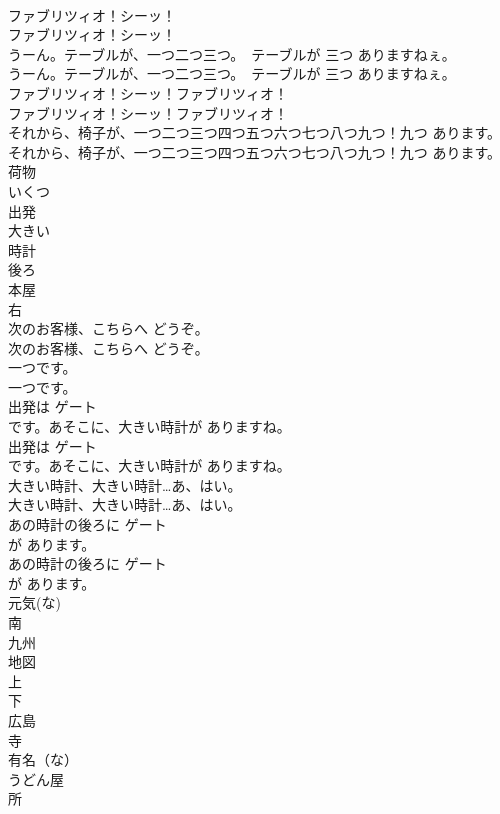 \documentclass[8pt]{extreport}
\begin{document}
\begin{CJK}{UTF8}{min}
\\	ファブリツィオ！シーッ！	
\\	ファブリツィオ！シーッ！ 
\\	うーん。テーブルが、一つ二つ三つ。　テーブルが 三つ ありますねぇ。	
\\	うーん。テーブルが、一つ二つ三つ。　テーブルが 三つ ありますねぇ。 
\\	ファブリツィオ！シーッ！ファブリツィオ！	
\\	ファブリツィオ！シーッ！ファブリツィオ！ 
\\	それから、椅子が、一つ二つ三つ四つ五つ六つ七つ八つ九つ！九つ あります。	
\\	それから、椅子が、一つ二つ三つ四つ五つ六つ七つ八つ九つ！九つ あります。 
\\	荷物
\\	いくつ
\\	出発
\\	大きい
\\	時計
\\	後ろ
\\	本屋
\\	右
\\	次のお客様、こちらへ どうぞ。	
\\	次のお客様、こちらへ どうぞ。 
\\	一つです。	
\\	一つです。 
\\	出発は ゲート
\\	です。あそこに、大きい時計が ありますね。	
\\	出発は ゲート
\\	です。あそこに、大きい時計が ありますね。 
\\	大きい時計、大きい時計…あ、はい。	
\\	大きい時計、大きい時計…あ、はい。 
\\	あの時計の後ろに ゲート
\\	が あります。	
\\	あの時計の後ろに ゲート
\\	が あります。 
\\	元気(な)
\\	南
\\	九州
\\	地図
\\	上
\\	下
\\	広島
\\	寺
\\	有名（な）
\\	うどん屋
\\	所

\end{CJK}
\end{document}
